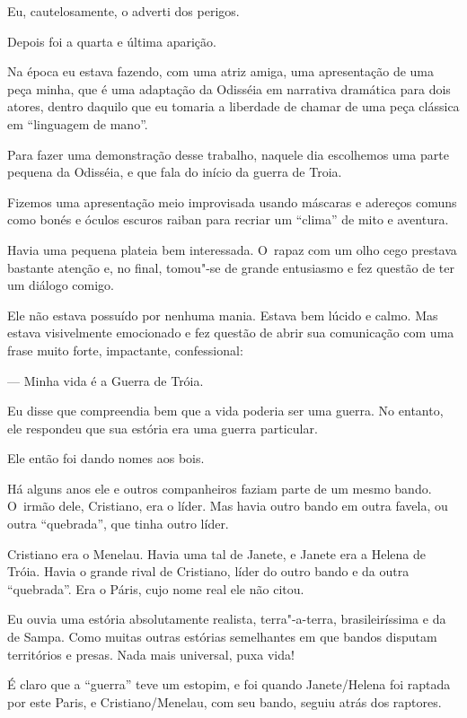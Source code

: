 Eu, cautelosamente, o adverti dos perigos.

\asterisc{}

Depois foi a quarta e última aparição.

Na época eu estava fazendo, com uma atriz amiga, uma apresentação de uma
peça minha, que é uma adaptação da Odisséia em narrativa dramática para
dois atores, dentro daquilo que eu tomaria a liberdade de chamar de uma
peça clássica em ``linguagem de mano''.

Para fazer uma demonstração desse trabalho, naquele dia escolhemos uma
parte pequena da Odisséia, e que fala do início da guerra de Troia.

Fizemos uma apresentação meio improvisada usando máscaras e adereços
comuns como bonés e óculos escuros raiban para recriar um ``clima'' de
mito e aventura.

Havia uma pequena plateia bem interessada. O~rapaz com um olho cego
prestava bastante atenção e, no final, tomou"-se de grande entusiasmo e
fez questão de ter um diálogo comigo.

Ele não estava possuído por nenhuma mania. Estava bem lúcido e calmo.
Mas estava visivelmente emocionado e fez questão de abrir sua
comunicação com uma frase muito forte, impactante, confessional:

— Minha vida é a Guerra de Tróia.

Eu disse que compreendia bem que a vida poderia ser uma guerra. No
entanto, ele respondeu que sua estória era uma guerra particular.

Ele então foi dando nomes aos bois.

Há alguns anos ele e outros companheiros faziam parte de um mesmo bando.
O~irmão dele, Cristiano, era o líder. Mas havia outro bando em outra
favela, ou outra ``quebrada'', que tinha outro líder.

Cristiano era o Menelau. Havia uma tal de Janete, e Janete era a Helena
de Tróia. Havia o grande rival de Cristiano, líder do outro bando e da
outra ``quebrada''. Era o Páris, cujo nome real ele não citou.

Eu ouvia uma estória absolutamente realista, terra"-a-terra,
brasileiríssima e da  de Sampa. Como muitas outras estórias
semelhantes em que bandos disputam territórios e presas. Nada mais
universal, puxa vida!

É claro que a ``guerra'' teve um estopim, e foi quando Janete/Helena foi
raptada por este Paris, e Cristiano/Menelau, com seu bando, seguiu atrás
dos raptores.

